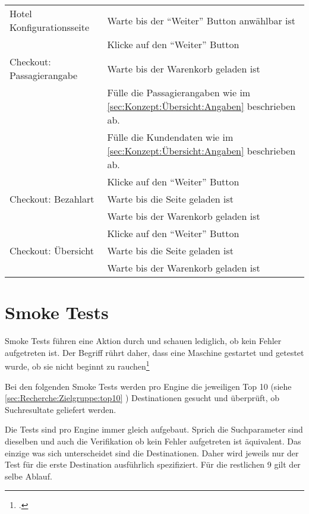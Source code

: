 \begin{table}[H]
\begin{tabularx}{0.9\textwidth}{ | l | X | }
		\multirow{1}{*}{Hotel Konfigurationsseite} & Warte bis der "`Weiter"' Button anwählbar ist \\ \cline{2-2}
		& Klicke auf den "`Weiter"' Button \\ \hline
		
		\multirow{1}{*}{Checkout: Passagierangabe} & Warte bis der Warenkorb geladen ist \\ \cline{2-2}
		& Fülle die Passagierangaben wie im \cref{sec:Konzept:Übersicht:Angaben} \nameref{sec:Konzept:Übersicht:Angaben} beschrieben ab. \\ \cline{2-2}
		& Fülle die Kundendaten wie im \cref{sec:Konzept:Übersicht:Angaben} \nameref{sec:Konzept:Übersicht:Angaben} beschrieben ab. \\ \cline{2-2}
		& Klicke auf den "`Weiter"' Button \\ \hline
		
		\multirow{1}{*}{Checkout: Bezahlart} & Warte bis die Seite geladen ist \\ \cline{2-2}
		& Warte bis der Warenkorb geladen ist \\ \cline{2-2}
		& Klicke auf den "`Weiter"' Button \\ \hline
		
		\multirow{1}{*}{Checkout: Übersicht} & Warte bis die Seite geladen ist \\ \cline{2-2}
		& Warte bis der Warenkorb geladen ist \\ \hline
	\end{tabularx} 
\end{table}

\section{Smoke Tests}
\label{sec:konzept:smoketests}
Smoke Tests führen eine Aktion durch und schauen lediglich, ob kein Fehler aufgetreten ist. Der Begriff rührt daher, dass eine Maschine gestartet und getestet wurde, ob sie nicht beginnt zu rauchen\footcite{Smoke_testing_software_-_Wikipedia_the_free_encyclopedia_2015-08-01}

Bei den folgenden Smoke Tests werden pro Engine die jeweiligen Top 10 (siehe \cref{sec:Recherche:Zielgruppe:top10} ) Destinationen gesucht und überprüft, ob Suchresultate geliefert werden.

Die Tests sind pro Engine immer gleich aufgebaut. Sprich die Suchparameter sind dieselben und auch die Verifikation ob kein Fehler aufgetreten ist äquivalent. Das einzige was sich unterscheidet sind die Destinationen. Daher wird jeweils nur der Test für die erste Destination ausführlich spezifiziert. Für die restlichen 9 gilt der selbe Ablauf.

